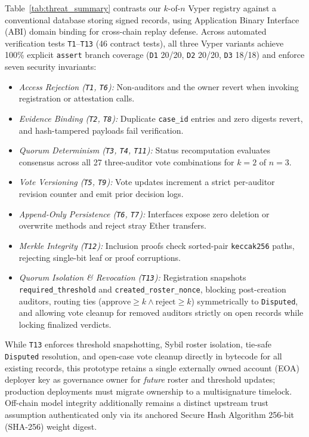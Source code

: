 \documentclass[conference]{IEEEtran}
\begin{document}
Table~\ref{tab:threat_summary} contrasts our $k$-of-$n$ Vyper registry against a conventional database storing signed records, using Application Binary Interface (ABI) domain binding for cross-chain replay defense. Across automated verification tests \texttt{T1}--\texttt{T13} (46 contract tests), all three Vyper variants achieve 100\% explicit \texttt{assert} branch coverage (\texttt{D1} 20/20, \texttt{D2} 20/20, \texttt{D3} 18/18) and enforce seven security invariants:
\begin{itemize}
\item \emph{Access Rejection (\texttt{T1}, \texttt{T6}):} Non-auditors and the owner revert when invoking registration or attestation calls.
\item \emph{Evidence Binding (\texttt{T2}, \texttt{T8}):} Duplicate \texttt{case\_id} entries and zero digests revert, and hash-tampered payloads fail verification.
\item \emph{Quorum Determinism (\texttt{T3}, \texttt{T4}, \texttt{T11}):} Status recomputation evaluates consensus across all 27 three-auditor vote combinations for $k=2$ of $n=3$.
\item \emph{Vote Versioning (\texttt{T5}, \texttt{T9}):} Vote updates increment a strict per-auditor revision counter and emit prior decision logs.
\item \emph{Append-Only Persistence (\texttt{T6}, \texttt{T7}):} Interfaces expose zero deletion or overwrite methods and reject stray Ether transfers.
\item \emph{Merkle Integrity (\texttt{T12}):} Inclusion proofs check sorted-pair \texttt{keccak256} paths, rejecting single-bit leaf or proof corruptions.
\item \emph{Quorum Isolation \& Revocation (\texttt{T13}):} Registration snapshots \texttt{required\_\allowbreak threshold} and \texttt{created\_\allowbreak roster\_\allowbreak nonce}, blocking post-creation auditors, routing ties ($\text{approve}\ge k \land \text{reject}\ge k$) symmetrically to \texttt{Disputed}, and allowing vote cleanup for removed auditors strictly on open records while locking finalized verdicts.
\end{itemize}

While \texttt{T13} enforces threshold snapshotting, Sybil roster isolation, tie-safe \texttt{Disputed} resolution, and open-case vote cleanup directly in bytecode for all existing records, this prototype retains a single externally owned account (EOA) deployer key as governance owner for \emph{future} roster and threshold updates; production deployments must migrate ownership to a multisignature timelock. Off-chain model integrity additionally remains a distinct upstream trust assumption authenticated only via its anchored Secure Hash Algorithm 256-bit (SHA-256) weight digest.
\end{document}

